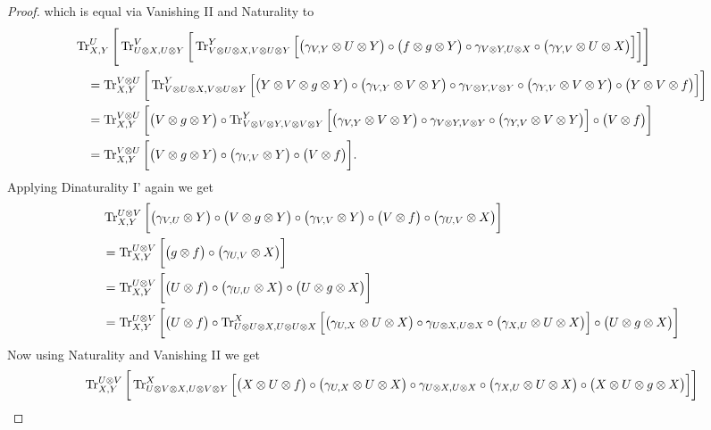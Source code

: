 \begin{proof}
{ which is equal via Vanishing II and Naturality to
 \begin{align*}
  &\operatorname{Tr}^U_{X,Y}\Bigg[\operatorname{Tr}^V_{U\otimes X,U\otimes Y}\bigg[\operatorname{Tr}^Y_{V\otimes U\otimes X,V\otimes U\otimes Y}\Big[\big(\gamma_{V,Y}\otimes U\otimes Y\big)\circ\big(f\otimes g\otimes Y\big)\circ\gamma_{V\otimes Y,U\otimes X}\circ\big(\gamma_{Y,V}\otimes U\otimes X\big)\Big]\bigg]\Bigg]\\
  &\quad=\operatorname{Tr}^{V\otimes U}_{X,Y}\bigg[\operatorname{Tr}^Y_{V\otimes U\otimes X,V\otimes U\otimes Y}\Big[\big(Y\otimes V\otimes g\otimes Y\big)\circ\big(\gamma_{V,Y}\otimes V\otimes Y\big)\circ\gamma_{V\otimes Y,V\otimes Y}\circ\big(\gamma_{Y,V}\otimes V\otimes Y\big)\circ\big(Y\otimes V\otimes f\big)\Big]\bigg]\\
  &\quad=\operatorname{Tr}^{V\otimes U}_{X,Y}\bigg[\big(V\otimes g\otimes Y\big)\circ\operatorname{Tr}^Y_{V\otimes V\otimes Y,V\otimes V\otimes Y}\Big[\big(\gamma_{V,Y}\otimes V\otimes Y\big)\circ\gamma_{V\otimes Y,V\otimes Y}\circ\big(\gamma_{Y,V}\otimes V\otimes Y\big)\Big]\circ\big(V\otimes f\big)\bigg]\\
  &\quad=\operatorname{Tr}^{V\otimes U}_{X,Y}\bigg[\big(V\otimes g\otimes Y\big)\circ\big(\gamma_{V,V}\otimes Y\big)\circ\big(V\otimes f\big)\bigg].
 \end{align*}
 Applying Dinaturality I' again we get
 \begin{align*}
  &\operatorname{Tr}^{U\otimes V}_{X,Y}\bigg[\big(\gamma_{V,U}\otimes Y\big)\circ\big(V\otimes g\otimes Y\big)\circ\big(\gamma_{V,V}\otimes Y\big)\circ\big(V\otimes f\big)\circ\big(\gamma_{U,V}\otimes X\big)\bigg]\\
  &=\operatorname{Tr}^{U\otimes V}_{X,Y}\bigg[\big(g\otimes f\big)\circ\big(\gamma_{U,V}\otimes X\big)\bigg]\\
  &=\operatorname{Tr}^{U\otimes V}_{X,Y}\bigg[\big(U\otimes f\big)\circ\big(\gamma_{U,U}\otimes X\big)\circ\big(U\otimes g\otimes X\big)\bigg]\\
  &=\operatorname{Tr}^{U\otimes V}_{X,Y}\bigg[\big(U\otimes f\big)\circ\operatorname{Tr}^X_{U\otimes U\otimes X,U\otimes U\otimes X}\Big[\big(\gamma_{U,X}\otimes U\otimes X\big)\circ\gamma_{U\otimes X, U\otimes X}\circ\big(\gamma_{X,U}\otimes U\otimes X\big)\Big]\circ\big(U\otimes g\otimes X\big)\bigg]
 \end{align*}
 Now using Naturality and Vanishing II we get
 \begin{align*}
  &\Tr^{U\otimes V}_{X,Y}\bigg[\Tr^X_{U\otimes V\otimes X,U\otimes V\otimes Y}\Big[\big(X\otimes U\otimes f\big)\circ\big(\gamma_{U,X}\otimes U\otimes X\big)\circ\gamma_{U\otimes X, U\otimes X}\circ\big(\gamma_{X,U}\otimes U\otimes X\big)\circ\big(X\otimes U\otimes g\otimes X\big)\Big]\bigg]\\

\end{align*}}
\end{proof}
